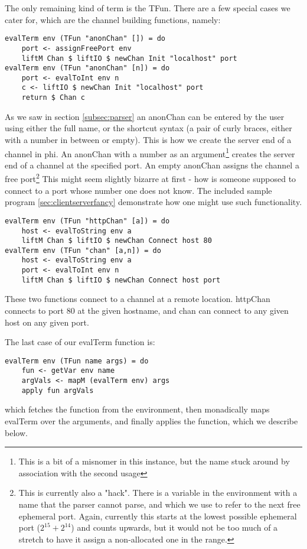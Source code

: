 The only remaining kind of term is the TFun. There are a few special cases we cater for, which are the channel building functions, namely:
\begin{verbatim}
evalTerm env (TFun "anonChan" []) = do
    port <- assignFreePort env
    liftM Chan $ liftIO $ newChan Init "localhost" port 
evalTerm env (TFun "anonChan" [n]) = do
    port <- evalToInt env n
    c <- liftIO $ newChan Init "localhost" port 
    return $ Chan c
\end{verbatim}
As we saw in section \ref{subsec:parser} an anonChan can be entered by the user using either the full name, or the shortcut syntax (a pair of curly braces, either with a number in between or empty). This is how we create the server end of a channel in phi. An anonChan with a number as an argument\footnote{This is a bit of a misnomer in this instance, but the name stuck around by association with the second usage} creates the server end of a channel at the specified port. An empty anonChan assigns the channel a free port\footnote{This is currently also a "hack". There is a variable in the environment with a name that the parser cannot parse, and which we use to refer to the next free ephemeral
port. Again, currently this starts at the lowest possible ephemeral port ($2^{15}+2^{14}$) and counts upwards, but it would not be too much of a stretch to have it assign a non-allocated one in the range.} This might seem slightly bizarre at first - how is someone supposed to connect to a port whose number one does not know. The included sample program \ref{sec:clientserverfancy} demonstrate how one might use such functionality.
\begin{verbatim}
evalTerm env (TFun "httpChan" [a]) = do
    host <- evalToString env a
    liftM Chan $ liftIO $ newChan Connect host 80
evalTerm env (TFun "chan" [a,n]) = do
    host <- evalToString env a
    port <- evalToInt env n
    liftM Chan $ liftIO $ newChan Connect host port
\end{verbatim}
These two functions connect to a channel at a remote location. httpChan connects to port 80 at the given hostname, and chan can connect to any given host on any given port.

The last case of our evalTerm function is:
\begin{verbatim}
evalTerm env (TFun name args) = do
    fun <- getVar env name
    argVals <- mapM (evalTerm env) args
    apply fun argVals
\end{verbatim}
which fetches the function from the environment, then monadically maps evalTerm over the arguments, and finally applies the function, which we describe below.

